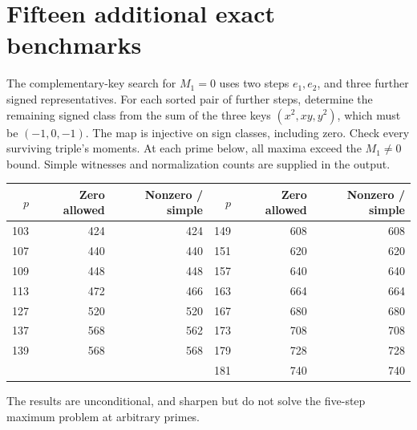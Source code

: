 \documentclass[11pt]{article}
\begin{document}
\section{Fifteen additional exact benchmarks}
The complementary-key search for $M_1=0$ uses two steps $e_1,e_2$,
and three further signed representatives. For each sorted pair
of further steps, determine the remaining signed class from the
sum of the three keys $(x^2,xy,y^2)$, which must be $(-1,0,-1)$.
The map is injective on sign classes, including zero.
Check every surviving triple's moments. At each prime below,
all maxima exceed the $M_1\ne0$ bound. Simple witnesses and
normalization counts are supplied in the output.
\begin{center}
\small
\begin{tabular}{rrr @{\qquad} rrr}
\toprule
$p$ & Zero allowed & Nonzero / simple &$p$ & Zero allowed & Nonzero / simple\\
\midrule
103&424&424&149&608&608\\
107&440&440&151&620&620\\
109&448&448&157&640&640\\
113&472&466&163&664&664\\
127&520&520&167&680&680\\
137&568&562&173&708&708\\
139&568&568&179&728&728\\
&&&181&740&740\\
\bottomrule
\end{tabular}
\end{center}
The results are unconditional, and sharpen but do not solve the
five-step maximum problem at arbitrary primes.
\end{document}
